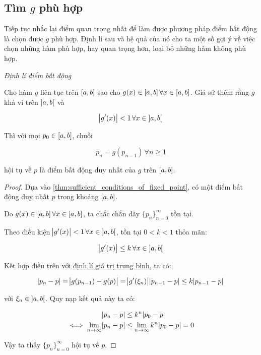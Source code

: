 \documentclass[../../Lectures]{subfiles}
\begin{document}
\subsection{Tìm \texorpdfstring{\(g\)}{g} phù hợp}

Tiếp tục nhắc lại điểm quan trọng nhất để làm được phương pháp điểm bất động là
chọn được \(g\) phù hợp. Định lí sau và hệ quả của nó cho ta một số gợi ý về
việc chọn những hàm phù hợp, hay quan trọng hơn, loại bỏ những hàm không phù
hợp.

\begin{theorem}\label{thm:fixed_point}
    \emph{Định lí điểm bất động}

    Cho hàm \(g\) liên tục trên \(\interval{a}{b}\) sao cho \(g(x) \in
    \interval{a}{b} \, \forall x \in \interval{a}{b}\). Giả sử thêm rằng \(g\)
    khả vi trên \(\interval[open]{a}{b}\) và

    \[\abs{g'(x)} < 1 \, \forall x \in \interval[open]{a}{b}\]

    Thì với mọi \(p_0 \in \interval{a}{b}\), chuỗi

    \[p_n = g(p_{n - 1}) \, \forall n \geq 1\]

    hội tụ về \(p\) là điểm bất động duy nhất của \(g\) trên
    \(\interval{a}{b}\).
\end{theorem}

\begin{proof}\label{proof:thm:fixed_point}
    Dựa vào \ref{thm:sufficient_conditions_of_fixed_point}, có một điểm bất động
    duy nhất \(p\) trong khoảng \(\interval{a}{b}\).

    Do \(g(x) \in \interval{a}{b} \, \forall x \in \interval{a}{b}\), ta chắc
    chắn dãy \(\{p_n\}_{n = 0}^\infty\) tồn tại.

    Theo điều kiện \(\abs{g'(x)} < 1 \, \forall x \in \interval[open]{a}{b}\),
    tồn tại \(0 < k < 1\) thỏa mãn:

    \[\abs{g'(x)} \leq k \, \forall x \in \interval[open]{a}{b}\]

    Kết hợp điều trên với \hyperref[thm:mean_value_theorem]{định lí giá trị
    trung bình}, ta có:

    \[\abs{p_n - p} = \abs{g(p_{n - 1}) - g(p)} = \abs{g'(\xi_n)} \abs{p_{n - 1} - p} \leq k \abs{p_{n - 1} - p}\]

    với \(\xi_n \in \interval[open]{a}{b}\). Quy nạp kết quả này ta có:

    \begin{align*}
                                 \abs{p_n - p} & \leq k^n \abs{p_0 - p} \\
        \iff \lim_{n \to \infty} \abs{p_n - p} & \leq \lim_{n \to \infty} k^n \abs{p_0 - p} = 0
    \end{align*}

    Vậy ta thấy \(\{p_n\}_{n = 0}^\infty\) hội tụ về \(p\).
\end{proof}
\end{document}
